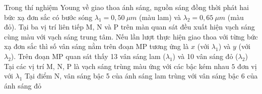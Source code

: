 \begin{ex}
Trong thí nghiệm Young về giao thoa ánh sáng, nguồn sáng đồng thời phát hai bức xạ đơn sắc có bước sóng $\lambda_1 = 0,50\ \mu m$ (màu lam) và $\lambda_2 = 0,65\ \mu m$ (màu đỏ). Tại ba vị trí liên tiếp M, N và P trên màn quan sát đều xuất hiện vạch sáng cùng màu với vạch sáng trung tâm. Nếu lần lượt thực hiện giao thoa với từng bức xạ đơn sắc thì số vân sáng nằm trên đoạn MP tương ứng là $x$ (với $\lambda_1$) và $y$ (với $\lambda_2$).
{Trên đoạn MP quan sát thấy 13 vân sáng lam ($\lambda_1$) và 10 vân sáng đỏ ($\lambda_2$)}
{Tại các vị trí M, N, P là vạch sáng trùng màu ứng với các bậc kém nhau $5$ đơn vị với $\lambda_1$}
{Tại điểm N, vân sáng bậc 5 của ánh sáng lam trùng với vân sáng bậc 6 của ánh sáng đỏ}
\loigiai{
\begin{itemchoice}
\itemch 
\itemch 
\itemch 
\itemch 
\end{itemchoice}
}
\end{ex}


